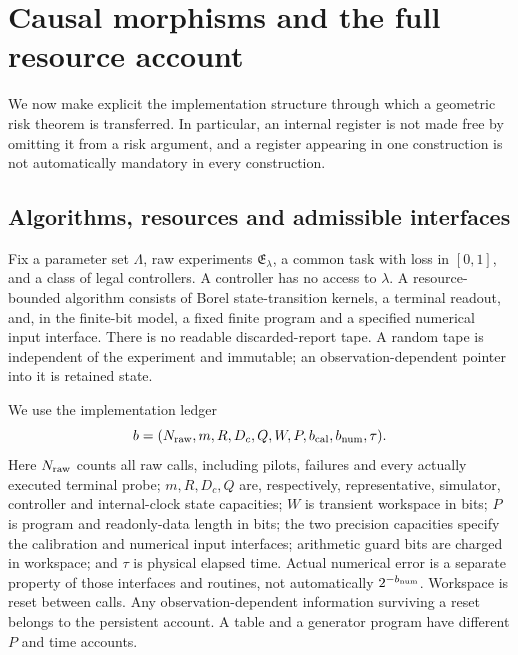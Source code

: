 \section{Causal morphisms and the full resource account}\label{sec:transfer}
We now make explicit the implementation structure through which a geometric risk theorem is transferred. In particular, an internal register is not made free by omitting it from a risk argument, and a register appearing in one construction is not automatically mandatory in every construction.

\subsection{Algorithms, resources and admissible interfaces}
Fix a parameter set $\Lambda$, raw experiments $\mathfrak E_\lambda$, a common task with loss in $[0,1]$, and a class of legal controllers. A controller has no access to $\lambda$. A resource-bounded algorithm consists of Borel state-transition kernels, a terminal readout, and, in the finite-bit model, a fixed finite program and a specified numerical input interface. There is no readable discarded-report tape. A random tape is independent of the experiment and immutable; an observation-dependent pointer into it is retained state.

We use the implementation ledger
\begin{equation}\label{eq:full-budget}
 b=(N_{\rm raw},m,R,D_c,Q,W,P,b_{\rm cal},b_{\rm num},\tau).
\end{equation}
Here $N_{\rm raw}$ counts all raw calls, including pilots, failures and every actually executed terminal probe; $m,R,D_c,Q$ are, respectively, representative, simulator, controller and internal-clock state capacities; $W$ is transient workspace in bits; $P$ is program and readonly-data length in bits; the two precision capacities specify the calibration and numerical input interfaces; arithmetic guard bits are charged in workspace; and $\tau$ is physical elapsed time. Actual numerical error is a separate property of those interfaces and routines, not automatically $2^{-b_{\rm num}}$. Workspace is reset between calls. Any observation-dependent information surviving a reset belongs to the persistent account. A table and a generator program have different $P$ and time accounts.

